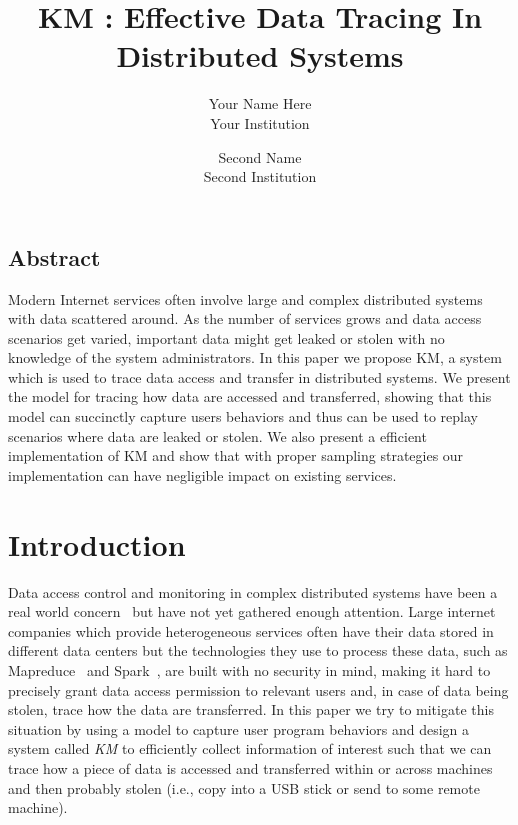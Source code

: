 \documentclass[letterpaper,twocolumn,10pt]{article}
\begin{document}
\date{}

\title{\Large \bf KM : Effective Data Tracing In Distributed Systems}

\author{
{\rm Your Name Here}\\
Your Institution\\
\and
{\rm Second Name}\\
Second Institution
} %

\maketitle

\thispagestyle{empty}


\subsection*{Abstract}
Modern Internet services often involve large and complex distributed systems
with data scattered around. As the number of services grows and data access
scenarios get varied, important data might get leaked or stolen with no
knowledge of the system administrators. In this paper we propose KM, a system
which is used to trace data access and transfer in distributed systems. We
present the model for tracing how data are accessed and transferred, showing
that this model can succinctly capture users behaviors and thus can be used
to replay scenarios where data are leaked or stolen. We also present a
efficient implementation of KM and show that with proper sampling strategies
our implementation can have negligible impact on existing services. 

\section{Introduction}
Data access control and monitoring in complex distributed systems have been a
real world concern~\cite{SomeBigPaper2009} but have not yet gathered enough
attention. Large internet companies which provide heterogeneous services
often have their data stored in different data centers but the technologies
they use to process these data, such as Mapreduce~\cite{Dean:2008} and
Spark~\cite{spark2010}, are built with no security in mind, making it hard to
precisely grant data access permission to relevant users and, in case of data
being stolen, trace how the data are transferred. In this paper we try to
mitigate this situation by using a model to capture user program behaviors
and design a system called \textit{KM} to efficiently collect information of
interest such that we can trace how a piece of data is accessed and
transferred within or across machines and then probably stolen (i.e., copy
into a USB stick or send to some remote machine). 
\end{document}
